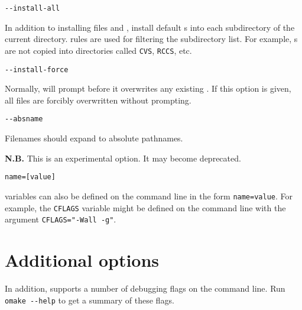  \verb+--install-all+

In addition to installing files  and , install default
s into each subdirectory of the current directory.   rules are used for
filtering the subdirectory list.  For example, s are not copied into directories
called \verb+CVS+, \verb+RCCS+, etc.

 \verb+--install-force+

Normally,  will prompt before it overwrites any existing .  If this
option is given, all files are forcibly overwritten without prompting.

 \verb+--absname+

Filenames should expand to absolute pathnames.

\textbf{N.B.} This is an experimental option. It may become deprecated.

 \verb+name=[value]+

 variables can also be defined on the command line in the form \verb+name=value+.  For
example, the \verb+CFLAGS+ variable might be defined on the command line with the argument
\verb+CFLAGS="-Wall -g"+.

\section{Additional options}

In addition,  supports a number of debugging flags on the command line. Run
\verb+omake --help+ to get a summary of these flags.

